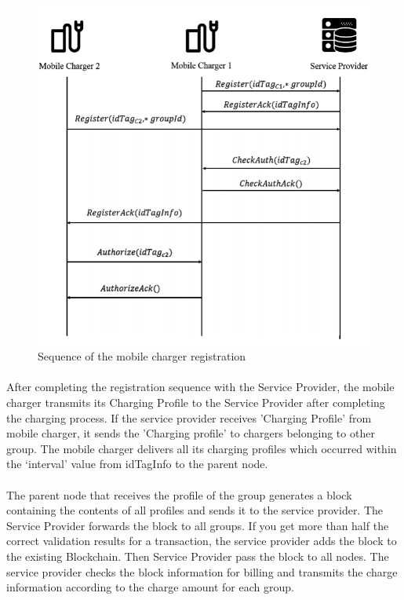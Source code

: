 \begin{figure}[H]
	\centering
	\includegraphics[scale=0.4]{charger_registration.png}
	\caption{Sequence of the mobile charger registration}
\end{figure}

\paragraph{}After completing the registration sequence with the Service
Provider, the mobile charger transmits its Charging Profile to
the Service Provider after completing the charging process. If
the service provider receives 'Charging Profile' from mobile
charger, it sends the 'Charging profile' to chargers belonging to
other group. The mobile charger delivers all its charging
profiles which occurred within the ‘interval’ value from
idTagInfo to the parent node.
\paragraph{}
The parent node that receives the
profile of the group generates a block containing the contents
of all profiles and sends it to the service provider. The Service
Provider forwards the block to all groups. If you get more than
half the correct validation results for a transaction, the service
provider adds the block to the existing Blockchain. Then
Service Provider pass the block to all nodes. The service
provider checks the block information for billing and transmits
the charge information according to the charge amount for each
group.

